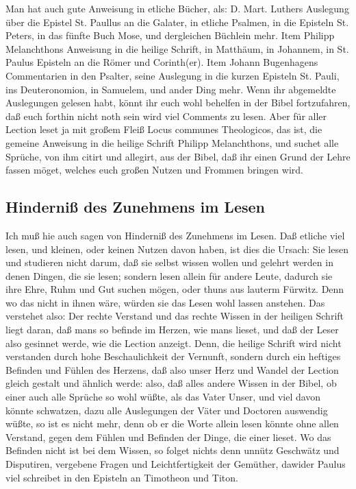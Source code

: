 Man hat auch gute Anweisung in etliche Bücher, als: D. Mart. Luthers Auslegung über die Epistel St. Paullus an die Galater, in etliche Psalmen, in die Episteln St. Peters, in das fünfte Buch Mose, und dergleichen Büchlein mehr. Item Philipp Melanchthons Anweisung in die heilige Schrift, in Matthäum, in Johannem, in St. Paulus Episteln an die Römer und Corinth(er). Item Johann Bugenhagens Commentarien in den Psalter, seine Auslegung in die kurzen Episteln St. Pauli, ins Deuteronomion, in Samuelem, und ander Ding mehr. Wenn ihr abgemeldte Auslegungen gelesen habt, könnt ihr euch wohl behelfen in der Bibel fortzufahren, daß euch forthin nicht noth sein wird viel Comments zu lesen. Aber für aller Lection leset ja mit großem Fleiß Locus communes Theologicos, das ist, die gemeine Anweisung in die heilige Schrift Philipp Melanchthons, und suchet alle Sprüche, von ihm citirt und allegirt, aus der Bibel, daß ihr einen Grund der Lehre fassen möget, welches euch großen Nutzen und Frommen bringen wird.

\subsection{Hinderniß des Zunehmens im Lesen}

Ich muß hie auch sagen von Hinderniß des Zunehmens im Lesen. Daß etliche viel lesen, und kleinen, oder keinen Nutzen davon haben, ist dies die Ursach: Sie lesen und studieren nicht darum, daß sie selbst wissen wollen und gelehrt werden in denen Dingen, die sie lesen; sondern lesen allein für andere Leute, dadurch sie ihre Ehre, Ruhm und Gut suchen mögen, oder thuns aus lauterm Fürwitz. Denn wo das nicht in ihnen wäre, würden sie das Lesen wohl lassen anstehen. Das verstehet also: Der rechte Verstand und das rechte Wissen in der heiligen Schrift liegt daran, daß mans so befinde im Herzen, wie mans lieset,
und daß der Leser also gesinnet werde, wie die Lection anzeigt. Denn, die heilige Schrift wird nicht verstanden durch hohe Beschaulichkeit der Vernunft, sondern durch ein heftiges Befinden und Fühlen des Herzens, daß also unser Herz und Wandel der Lection gleich gestalt und ähnlich werde: also, daß alles andere Wissen in der Bibel, ob einer auch alle Sprüche so wohl wüßte, als das Vater Unser, und viel davon könnte schwatzen, dazu alle Auslegungen der Väter und Doctoren auswendig wüßte, so ist es nicht mehr, denn ob er die Worte allein lesen könnte ohne allen Verstand, gegen dem Fühlen und Befinden der Dinge, die einer lieset. Wo das Befinden nicht ist bei dem Wissen, so folget nichts denn unnütz Geschwätz und Disputiren, vergebene Fragen und Leichtfertigkeit der Gemüther, dawider Paulus viel schreibet in den Episteln an Timotheon und Titon.

